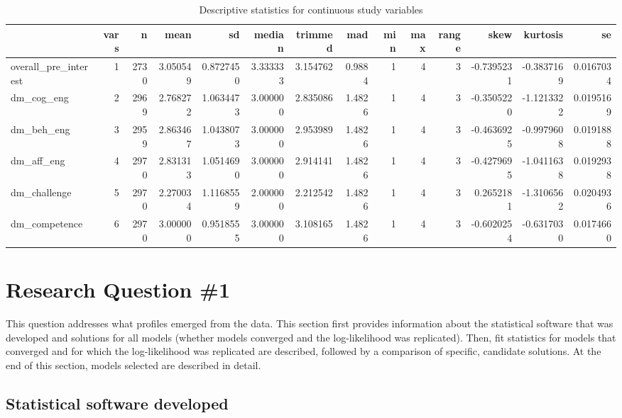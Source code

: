 \documentclass[]{msu-thesis}
\theoremstyle{definition}
\theoremstyle{definition}
\theoremstyle{definition}
\theoremstyle{remark}
\begin{document}
\begin{table}

\caption{\label{tab:unnamed-chunk-4}Descriptive statistics for continuous study variables}
\centering
\begin{tabular}[t]{lrrrrrrrrrrrrr}
\toprule
  & vars & n & mean & sd & median & trimmed & mad & min & max & range & skew & kurtosis & se\\
\midrule
overall\_pre\_interest & 1 & 2730 & 3.050549 & 0.8727450 & 3.333333 & 3.154762 & 0.9884 & 1 & 4 & 3 & -0.7395231 & -0.3837169 & 0.0167034\\
dm\_cog\_eng & 2 & 2969 & 2.768272 & 1.0634473 & 3.000000 & 2.835086 & 1.4826 & 1 & 4 & 3 & -0.3505220 & -1.1213322 & 0.0195169\\
dm\_beh\_eng & 3 & 2959 & 2.863467 & 1.0438073 & 3.000000 & 2.953989 & 1.4826 & 1 & 4 & 3 & -0.4636925 & -0.9979608 & 0.0191888\\
dm\_aff\_eng & 4 & 2970 & 2.831313 & 1.0514690 & 3.000000 & 2.914141 & 1.4826 & 1 & 4 & 3 & -0.4279695 & -1.0411638 & 0.0192938\\
dm\_challenge & 5 & 2970 & 2.270034 & 1.1168559 & 2.000000 & 2.212542 & 1.4826 & 1 & 4 & 3 & 0.2652181 & -1.3106562 & 0.0204936\\
dm\_competence & 6 & 2970 & 3.000000 & 0.9518555 & 3.000000 & 3.108165 & 1.4826 & 1 & 4 & 3 & -0.6020254 & -0.6317030 & 0.0174660\\
\bottomrule
\end{tabular}
\end{table}

\section{Research Question \#1}\label{research-question-1}

This question addresses what profiles emerged from the data. This
section first provides information about the statistical software that
was developed and solutions for all models (whether models converged and
the log-likelihood was replicated). Then, fit statistics for models that
converged and for which the log-likelihood was replicated are described,
followed by a comparison of specific, candidate solutions. At the end of
this section, models selected are described in detail.

\subsection{Statistical software
developed}\label{statistical-software-developed}
\end{document}

